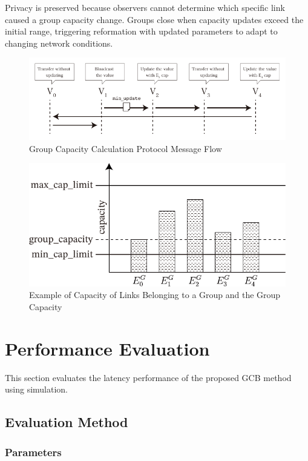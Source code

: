 \documentclass[conference]{IEEEtran}
\begin{document}
Privacy is preserved because observers cannot determine which specific link caused a group capacity change. Groups close when capacity updates exceed the initial range, triggering reformation with updated parameters to adapt to changing network conditions.

\begin{figure}[htbp]
	\centerline{\includegraphics[width=\linewidth]{fig/group_cap_handover}}
	\caption{Group Capacity Calculation Protocol Message Flow}
	\label{fig:group_cap_handover}
\end{figure}

\begin{figure}[htbp]
	\centerline{\includegraphics[width=0.85\linewidth]{fig/capacities_in_group}}
	\caption{Example of Capacity of Links Belonging to a Group and the Group Capacity}
	\label{fig:capacities_in_group}
\end{figure}

\section{Performance Evaluation}

This section evaluates the latency performance of the proposed GCB method using simulation.

\subsection{Evaluation Method}

\subsubsection{Parameters}
\end{document}

